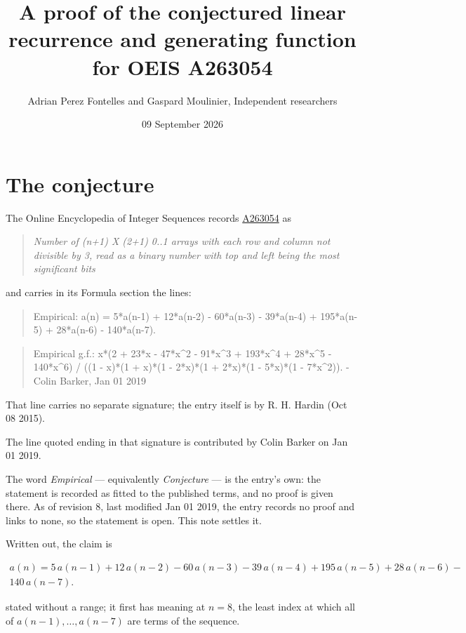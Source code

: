 \documentclass[11pt]{article}
\title{A proof of the conjectured linear recurrence and generating function for OEIS A263054}
\author{Adrian Perez Fontelles and Gaspard Moulinier, Independent researchers}
\date{09 September 2026}
\theoremstyle{definition}
\begin{document}
\maketitle
\section{The conjecture}

The Online Encyclopedia of Integer Sequences records \href{https://oeis.org/A263054}{A263054} as

\begin{quote}\itshape Number of (n+1) X (2+1) 0..1 arrays with each row and column not divisible by 3, read as a binary number with top and left being the most significant bits\end{quote}

and carries in its Formula section the lines:

\begin{quote}\ttfamily Empirical: a(n) = 5*a(n-1) + 12*a(n-2) - 60*a(n-3) - 39*a(n-4) + 195*a(n-5) + 28*a(n-6) - 140*a(n-7).\end{quote}

\begin{quote}\ttfamily Empirical g.f.: x*(2 + 23*x - 47*x\textasciicircum{}2 - 91*x\textasciicircum{}3 + 193*x\textasciicircum{}4 + 28*x\textasciicircum{}5 - 140*x\textasciicircum{}6) / ((1 - x)*(1 + x)*(1 - 2*x)*(1 + 2*x)*(1 - 5*x)*(1 - 7*x\textasciicircum{}2)). - Colin Barker, Jan 01 2019\end{quote}

That line carries no separate signature; the entry itself is by R. H. Hardin (Oct 08 2015).

The line quoted ending in that signature is contributed by Colin Barker on Jan 01 2019.

The word {\itshape Empirical} --- equivalently {\itshape Conjecture} --- is the entry's own: the statement is recorded as fitted to the published terms, and no proof is given there. As of revision 8, last modified Jan 01 2019, the entry records no proof and links to none, so the statement is open. This note settles it.

Written out, the claim is

\begin{multline*} a(n) = 5\,a(n-1) + 12\,a(n-2) - 60\,a(n-3) - 39\,a(n-4) + 195\,a(n-5) + 28\,a(n-6) - \\ 140\,a(n-7). \end{multline*}

stated without a range; it first has meaning at $n = 8$, the least index at which all of $a(n-1),\dots,a(n-7)$ are terms of the sequence.
\end{document}
